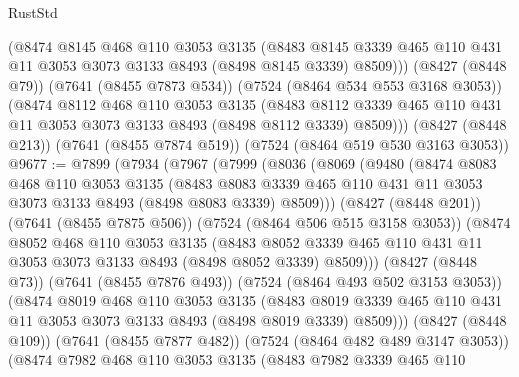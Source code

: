 \begin{lexlean}{RustStd}
\begin{coremodule}
{\begin{coremodule}
{{{{{{{{{{{{{{{{{{{{{{{{{{{{{{{{        (@8474
          @8145
          @468
          @110
          @3053
          @3135
          (@8483 @8145 @3339 @465 @110 @431 @11 @3053 @3073 @3133 @8493 (@8498 @8145 @3339) @8509)))
      (@8427 (@8448 @79))
      (@7641 (@8455 @7873 @534))
      (@7524 (@8464 @534 @553 @3168 @3053))
      (@8474
        @8112
        @468
        @110
        @3053
        @3135
        (@8483 @8112 @3339 @465 @110 @431 @11 @3053 @3073 @3133 @8493 (@8498 @8112 @3339) @8509)))
    (@8427 (@8448 @213))
    (@7641 (@8455 @7874 @519))
    (@7524 (@8464 @519 @530 @3163 @3053))
@9677 := @7899
    (@7934
      (@7967
        (@7999
          (@8036
            (@8069
              (@9480
                (@8474
                  @8083
                  @468
                  @110
                  @3053
                  @3135
                  (@8483
                    @8083
                    @3339
                    @465
                    @110
                    @431
                    @11
                    @3053
                    @3073
                    @3133
                    @8493
                    (@8498 @8083 @3339)
                    @8509)))
              (@8427 (@8448 @201))
              (@7641 (@8455 @7875 @506))
              (@7524 (@8464 @506 @515 @3158 @3053))
              (@8474
                @8052
                @468
                @110
                @3053
                @3135
                (@8483
                  @8052
                  @3339
                  @465
                  @110
                  @431
                  @11
                  @3053
                  @3073
                  @3133
                  @8493
                  (@8498 @8052 @3339)
                  @8509)))
            (@8427 (@8448 @73))
            (@7641 (@8455 @7876 @493))
            (@7524 (@8464 @493 @502 @3153 @3053))
            (@8474
              @8019
              @468
              @110
              @3053
              @3135
              (@8483
                @8019
                @3339
                @465
                @110
                @431
                @11
                @3053
                @3073
                @3133
                @8493
                (@8498 @8019 @3339)
                @8509)))
          (@8427 (@8448 @109))
          (@7641 (@8455 @7877 @482))
          (@7524 (@8464 @482 @489 @3147 @3053))
          (@8474
            @7982
            @468
            @110
            @3053
            @3135
            (@8483
              @7982
              @3339
              @465
              @110
}}}}}}}}}}}}}}}}}}}}}}}}}}}}}}}}
\end{coremodule}}
\end{coremodule}
\end{lexlean}
